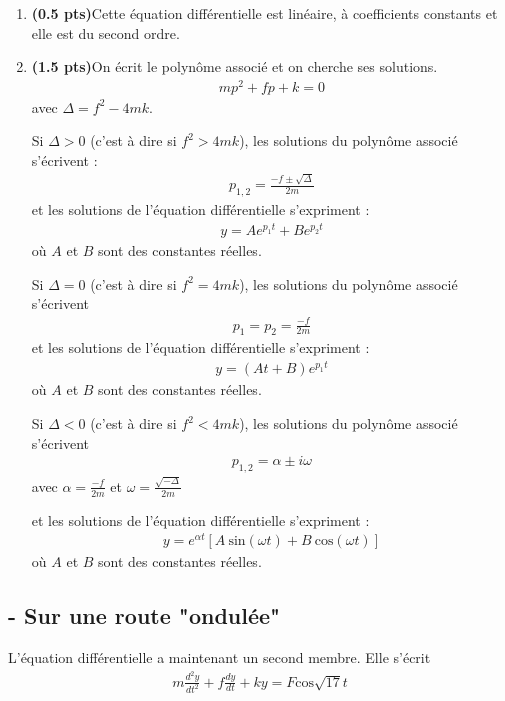 \documentclass[fleqn]{article}
\begin{document}
\begin{enumerate}
\item \textbf{(0.5 pts)}Cette \'equation diff\'erentielle est lin\'eaire, \`a coefficients constants et elle est du second ordre.
\item \textbf{(1.5 pts)}On \'ecrit le polyn\^ome associ\'e et on cherche ses solutions.
\begin{align*}
mp^{2}+fp+k=0
\end{align*}
avec $\Delta= f^2-4mk$.

Si $\Delta >0$  (c'est \`a dire si $f^{2} > 4mk$), les solutions du polyn\^ome associ\'e s'\'ecrivent :
\begin{align*}
p_{1,2}=\frac{- f \pm \sqrt{\Delta}}{2m}
\end{align*}
et les solutions de l'\'equation diff\'erentielle s'expriment :
\begin{align*}
y= Ae^{p_{1}t}+Be^{p_{2}t}
\end{align*}
o\`u $A$ et $B$ sont des constantes r\'eelles.

Si $\Delta =0$ (c'est \`a dire si $f^{2} = 4mk$), les solutions du polyn\^ome associ\'e s'\'ecrivent
\begin{align*}
p_{1} = p_{2} = \frac{-f }{2m}
\end{align*}
et les solutions de l'\'equation diff\'erentielle s'expriment :
\begin{align*}
y= (At+B)e^{p_{1}t}
\end{align*}
o\`u $A$ et $B$ sont des constantes r\'eelles.

Si $\Delta <0$ (c'est \`a dire si $f^{2} < 4mk$), les solutions du polyn\^ome associ\'e s'\'ecrivent
\begin{align*}
p_{1,2} = \alpha \pm i \omega   
\end{align*}
avec $\alpha= \frac{- f}{2m}$ et $\omega =\frac{\sqrt{-\Delta}}{2m}$

et les solutions de l'\'equation diff\'erentielle s'expriment :
\begin{align*}
y= e^{\alpha t} [A\  \text{sin}(\omega t) + B\  \text{cos} (\omega t)]
\end{align*}
o\`u $A$ et $B$ sont des constantes r\'eelles.
\end{enumerate}


\subsection{- Sur une route "ondul\'ee"}


L'\'equation diff\'erentielle a maintenant un second membre. Elle s'\'ecrit 
\begin{align*}
m\frac{d^{2}y}{dt^{2}}+f \frac{dy}{dt} +ky = F\text{cos} \sqrt{17}t
\end{align*}
\end{document}
